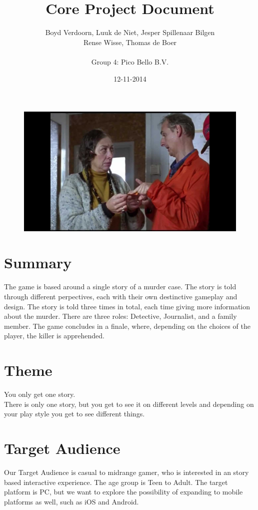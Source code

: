 \documentclass{article}
\title{Core Project Document}
\author{Boyd Verdoorn, Luuk de Niet, Jesper Spillenaar Bilgen\\ Rense Wisse, Thomas de Boer\\ \\Group 4: Pico Bello B.V.}
\date{12-11-2014}
\begin{document}
	\maketitle
	\begin{figure}[ht!]
		\centering
		\includegraphics[width=120mm]{Front.jpg}
	\end{figure}
	\newpage

	\section{Summary}
		The game is based around a single story of a murder case. The story is told through different perpectives, each with their own destinctive gameplay and design. The story is told three times in total, each time giving more information about the murder. There are three roles: Detective, Journalist, and a family member. The game concludes in a finale, where, depending on the choices of the player, the killer is apprehended.

	\section{Theme}
		You only get one story.\\
		There is only one story, but you get to see it on different levels and depending on your play style you get to see different things.

	\section{Target Audience}
		Our Target Audience is casual to midrange gamer, who is interested in an story based interactive experience. The age group is Teen to Adult. The target platform is PC, but we want to explore the possibility of expanding to mobile platforms as well, such as iOS and Android.
\end{document}
